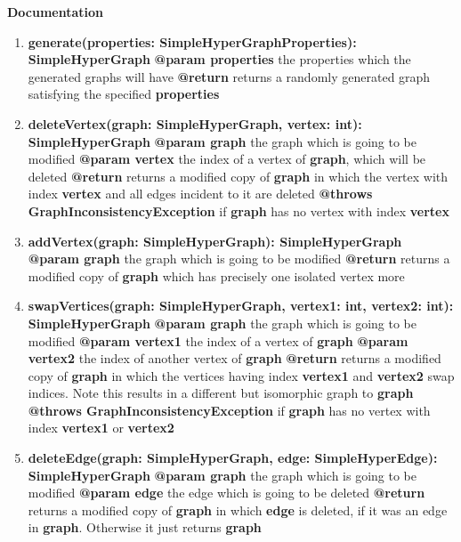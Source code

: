 	\textbf{Documentation}
	\begin{enumerate}[+]
		\item{
			\textbf{generate(properties: SimpleHyperGraphProperties): SimpleHyperGraph} \newline
			\textbf{@param properties} the properties which the generated graphs will have \newline
			\textbf{@return} returns a randomly generated graph satisfying the specified \textbf{properties}
		}
		\item{
			\textbf{deleteVertex(graph: SimpleHyperGraph, vertex: int): SimpleHyperGraph} \newline
			\textbf{@param graph} the graph which is going to be modified \newline
			\textbf{@param vertex} the index of a vertex of \textbf{graph}, which will be deleted \newline
			\textbf{@return} returns a modified copy of \textbf{graph} in which the vertex with index \textbf{vertex} and all edges incident to it are deleted \newline
			\textbf{@throws GraphInconsistencyException} if \textbf{graph} has no vertex with index \textbf{vertex} 
		}
		\item{
			\textbf{addVertex(graph: SimpleHyperGraph): SimpleHyperGraph} \newline
			\textbf{@param graph} the graph which is going to be modified \newline
			\textbf{@return} returns a modified copy of \textbf{graph} which has precisely one isolated vertex more
		}
		\item{
			\textbf{swapVertices(graph: SimpleHyperGraph, vertex1: int, vertex2: int): SimpleHyperGraph} \newline
			\textbf{@param graph} the graph which is going to be modified \newline
			\textbf{@param vertex1} the index of a vertex of \textbf{graph} \newline
			\textbf{@param vertex2} the index of another vertex of \textbf{graph} \newline
			\textbf{@return} returns a modified copy of \textbf{graph} in which the vertices having index \textbf{vertex1} and \textbf{vertex2} swap indices. Note this results in a different but isomorphic graph to \textbf{graph}  \newline
			\textbf{@throws GraphInconsistencyException} if \textbf{graph} has no vertex with index \textbf{vertex1} or \textbf{vertex2} 
		}
		\item{
			\textbf{deleteEdge(graph: SimpleHyperGraph, edge: SimpleHyperEdge): SimpleHyperGraph} \newline
			\textbf{@param graph} the graph which is going to be modified \newline
			\textbf{@param edge} the edge which is going to be deleted \newline
			\textbf{@return} returns a modified copy of \textbf{graph} in which \textbf{edge} is deleted, if it was an edge in \textbf{graph}. Otherwise it just returns \textbf{graph}
		}
		

\end{enumerate}
